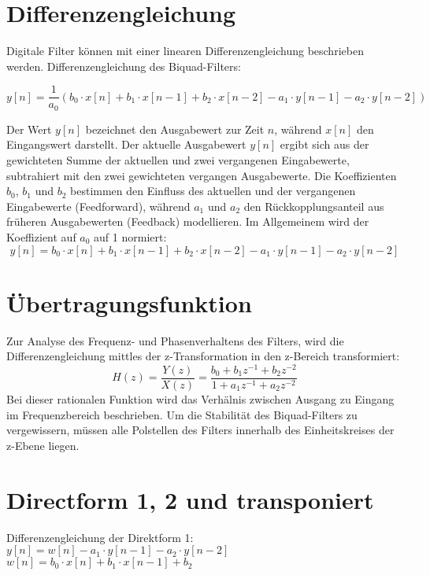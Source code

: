 \documentclass[
  ngerman,
  letterpaper,
  DIV=11]{scrreprt}
\begin{document}
\chapter{Differenzengleichung}\label{differenzengleichung}

Digitale Filter können mit einer linearen Differenzengleichung
beschrieben werden. Differenzengleichung des Biquad-Filters:

\[
y[n] =  \frac{1}{a_0}(b_0 \cdot x[n] + b_1 \cdot x[n - 1] + b_2 \cdot x[n - 2] - a_1 \cdot y[n - 1] - a_2 \cdot y[n - 2])
\]

Der Wert \(y[n]\) bezeichnet den Ausgabewert zur Zeit \(n\), während
\(x[n]\) den Eingangswert darstellt. Der aktuelle Ausgabewert \(y[n]\)
ergibt sich aus der gewichteten Summe der aktuellen und zwei vergangenen
Eingabewerte, subtrahiert mit den zwei gewichteten vergangen
Ausgabewerte. Die Koeffizienten \(b_0\), \(b_1\) und \(b_2\) bestimmen
den Einfluss des aktuellen und der vergangenen Eingabewerte
(Feedforward), während \(a_1\) und \(a_2\) den Rückkopplungsanteil aus
früheren Ausgabewerten (Feedback) modellieren. Im Allgemeinem wird der
Koeffizient auf \(a_0\) auf 1 normiert: \[
y[n] = b_0 \cdot x[n] + b_1 \cdot x[n - 1] + b_2 \cdot x[n - 2] - a_1 \cdot y[n - 1] - a_2 \cdot y[n - 2]
\]

\chapter{Übertragungsfunktion}\label{uxfcbertragungsfunktion}

Zur Analyse des Frequenz- und Phasenverhaltens des Filters, wird die
Differenzengleichung mittles der z-Transformation in den z-Bereich
transformiert: \[
H(z) = \frac{Y(z)}{X(z)} = \frac{b_0 + b_1 z^{-1} + b_2 z^{-2}}{1 + a_1 z^{-1} + a_2 z^{-2}}
\] Bei dieser rationalen Funktion wird das Verhälnis zwischen Ausgang zu
Eingang im Frequenzbereich beschrieben. Um die Stabilität des
Biquad-Filters zu vergewissern, müssen alle Polstellen des Filters
innerhalb des Einheitskreises der z-Ebene liegen.

\chapter{Directform 1, 2 und
transponiert}\label{directform-1-2-und-transponiert}

Differenzengleichung der Direktform 1:
\(y[n] = w[n] - a_1 \cdot y[n-1] - a_2 \cdot y[n-2]\)
\(w[n] = b_0 \cdot x[n] + b_1 \cdot x[n - 1] + b_2\)
\end{document}
